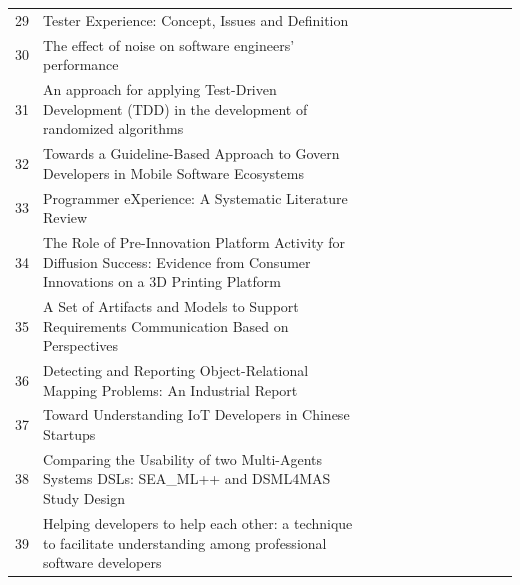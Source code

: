 \documentclass[english, 12pt, a4paper, sci, utf8, a-1b, online]{aaltothesis}
\begin{document}
\begin{center}
\begin{longtable}{p{0.05\linewidth}p{0.65\linewidth}p{0.30\linewidth}}
    29 & Tester Experience: Concept, Issues and Definition                                                                                           & \cite{ekwoge2017tester}                           \\
    30 & The effect of noise on software engineers' performance                                                                                      & \cite{romano2018effect}                           \\
    31 & An approach for applying Test-Driven Development (TDD) in the development of randomized algorithms                                          & \cite{ivo2018approach}                            \\
    32 & Towards a Guideline-Based Approach to Govern Developers in Mobile Software Ecosystems                                                       & \cite{de2017towards}                              \\
    33 & Programmer eXperience: A Systematic Literature Review                                                                                       & \cite{programmer-experience}                      \\
    34 & The Role of Pre-Innovation Platform Activity for Diffusion Success: Evidence from Consumer Innovations on a 3D Printing Platform            & \cite{claussen2019role}                           \\
    35 & A Set of Artifacts and Models to Support Requirements Communication Based on Perspectives                                                   & \cite{oran2017set}                                \\
    36 & Detecting and Reporting Object-Relational Mapping Problems: An Industrial Report                                                            & \cite{nazariodetecting}                           \\
    37 & Toward Understanding IoT Developers in Chinese Startups                                                                                     & \cite{zhang2018toward}                            \\
    38 & Comparing the Usability of two Multi-Agents Systems DSLs: SEA\_ML++ and DSML4MAS Study Design                                               & \cite{silvacomparing}                             \\
    39 & Helping developers to help each other: a technique to facilitate understanding among professional software developers                       & \cite{ollis2019helping}
  \end{longtable}
\end{center}
\end{document}
